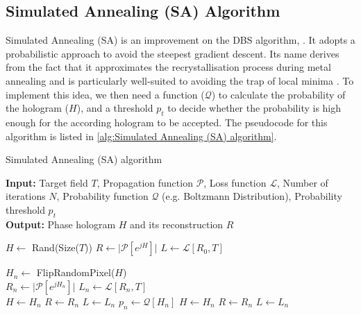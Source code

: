 \subsection{Simulated Annealing (SA) Algorithm}\label{sec:Simulated Annealing (SA) Algorithm}
Simulated Annealing (SA) is an improvement on the DBS algorithm,
\cite{Kirkpatrick1983}. It adopts a probabilistic approach to avoid the steepest gradient descent. Its name derives from the fact that it approximates the recrystallisation process during metal annealing and is particularly well-suited to avoiding the trap of local minima \cite{Yang2009}. To implement this idea, we then need a function ($\mathcal{Q}$) to calculate the probability of the hologram ($H$), and a threshold $p_t$ to decide whether the probability is high enough for the according hologram to be accepted. The pseudocode for this algorithm is listed in \cref{alg:Simulated Annealing (SA) algorithm}.
\begin{algorithm}[H]
  \caption{Simulated Annealing (SA) algorithm}\label{alg:Simulated Annealing (SA) algorithm}
  \textbf{Input:} Target field $T$, Propagation function $\mathcal{P}$, Loss function $\mathcal{L}$, Number of iterations $N$, Probability function $\mathcal{Q}$ (e.g. Boltzmann Distribution), Probability threshold $p_t$ \\
  \textbf{Output:} Phase hologram $H$ and its reconstruction $R$
  \begin{algorithmic}
    \State $H \gets$ Rand(Size($T$))
    \State $R \gets \vert \mathcal{P}[e^{jH}] \vert$
    \State $L \gets \mathcal{L} [R_0, T]$

    \State $H_n \gets$ FlipRandomPixel($H$)\\
    \State $R_n \gets \vert \mathcal{P}[e^{jH_n}] \vert$
    \State $L_n \gets \mathcal{L} [R_n, T]$\\
    \State $H \gets H_n$
    \State $R \gets R_n$
    \State $L \gets L_n$
    \Else
    \State $p_n \gets \mathcal{Q}[H_n]$
    \State $H \gets H_n$
    \State $R \gets R_n$
    \State $L \gets L_n$
    \EndIf
    \EndIf
    \EndFor
  \end{algorithmic}
\end{algorithm}


